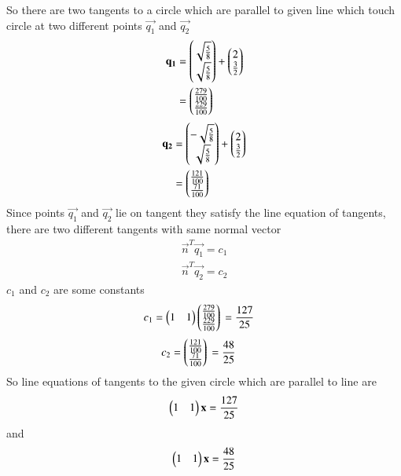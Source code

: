 \documentclass[journal,12pt,twocolumn]{IEEEtran}
\begin{document}
So there are two tangents to a circle which are parallel to given line which touch circle at two different points  $\vec{q_1}$ and $\vec{q_2}$
\begin{align}
\mathbf{q_1} &= \begin{pmatrix}\sqrt{\frac{5}{8}} \\ \sqrt{\frac{5}{8}}\end{pmatrix} + \begin{pmatrix}2 \\ \frac{3}{2}\end{pmatrix} \\
&= \begin{pmatrix}\frac{279}{100} \\ \frac{229}{100}\end{pmatrix}
\end{align}
\begin{align}
\mathbf{q_2} &= \begin{pmatrix}-\sqrt{\frac{5}{8}} \\ \sqrt{\frac{5}{8}}\end{pmatrix} + \begin{pmatrix}2 \\ \frac{3}{2}\end{pmatrix} \\
&= \begin{pmatrix}\frac{121}{100} \\ \frac{71}{100}\end{pmatrix}
\end{align}
Since points $\vec{q_1}$ and $\vec{q_2}$ lie on tangent they satisfy the line equation of tangents, there are two different tangents with same normal vector
\begin{align}
\vec{n}^T\vec{q_1} = c_1 \label{eq1}
\end{align}
\begin{align}
\vec{n}^T\vec{q_2} = c_2 \label{eq1}
\end{align}
$c_1$ and $c_2$ are some constants
\begin{align}
c_1=\myvec{1 & 1}\myvec{\frac{279}{100} \\ \frac{229}{100}}\newline
&= \frac{127}{25}
\end{align}
\newline
\begin{align}
c_2=\myvec{\frac{121}{100} \\ \frac{71}{100}}\newline
&= \frac{48}{25}
\end{align}
So line equations of tangents to the given circle which are parallel to line are
\begin{align}
\begin{pmatrix}1 &1\end{pmatrix}\mathbf{x}=\frac{127}{25}
\end{align}and
\newline
\begin{align}
\begin{pmatrix}1 &1\end{pmatrix}\mathbf{x}=\frac{48}{25}
\end{align}
\newline
\newline
\newline
\newline
\newline
\newline
\newline\newline
\newline
\newline
\end{document}

